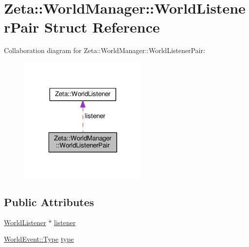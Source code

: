 \hypertarget{structZeta_1_1WorldManager_1_1WorldListenerPair}{\section{Zeta\+:\+:World\+Manager\+:\+:World\+Listener\+Pair Struct Reference}
\label{structZeta_1_1WorldManager_1_1WorldListenerPair}
}


Collaboration diagram for Zeta\+:\+:World\+Manager\+:\+:World\+Listener\+Pair\+:\nopagebreak
\begin{figure}[H]
\begin{center}
\leavevmode
\includegraphics[width=184pt]{structZeta_1_1WorldManager_1_1WorldListenerPair__coll__graph}
\end{center}
\end{figure}
\subsection*{Public Attributes}
\begin{DoxyCompactItemize}
\item 
\hyperlink{classZeta_1_1WorldListener}{World\+Listener} $\ast$ \hyperlink{structZeta_1_1WorldManager_1_1WorldListenerPair_af0885d194c09e4172f832139a913cf6b}{listener}
\item 
\hyperlink{classZeta_1_1WorldEvent_a92adb82c22c6f59afec5911098f85158}{World\+Event\+::\+Type} \hyperlink{structZeta_1_1WorldManager_1_1WorldListenerPair_ac3037b18f604f6a3e63426e88254352b}{type}
\end{DoxyCompactItemize}


